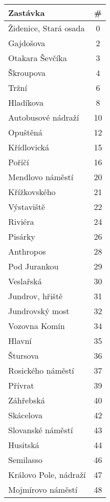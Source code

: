 \begin{table}[h]
  \centering
  \begin{minipage}{0.35\textwidth}
    \centering
    \begin{tabular}{|l|c|}
      \hline
      \textbf{Zastávka} & \# \\ \hline
      Židenice, Stará osada & 0 \\ \hline
      Gajdošova & 2 \\ \hline
      Otakara Ševčíka & 3 \\ \hline
      Škroupova & 4 \\ \hline
      Tržní & 6 \\ \hline
      Hladíkova & 8 \\ \hline
      Autobusové nádraží & 10 \\ \hline
      Opuštěná & 12 \\ \hline
      Křídlovická & 15 \\ \hline
      Poříčí & 16 \\ \hline
      Mendlovo náměstí & 20 \\ \hline
      Křížkovského & 21 \\ \hline
      Výstaviště & 22 \\ \hline
      Riviéra & 24 \\ \hline
      Pisárky & 26 \\ \hline
      Anthropos & 28 \\ \hline
      Pod Jurankou & 29 \\ \hline
      Veslařská & 30 \\ \hline
      Jundrov, hřiště & 31 \\ \hline
      Jundrovský most & 32 \\ \hline
      Vozovna Komín & 34 \\ \hline
      Hlavní & 35 \\ \hline
      Štursova & 36 \\ \hline
      Rosického náměstí & 37 \\ \hline
      Přívrat & 39 \\ \hline
      Záhřebská & 40 \\ \hline
      Skácelova & 42 \\ \hline
      Slovanské náměstí & 43 \\ \hline
      Husitská & 44 \\ \hline
      Semilasso & 46 \\ \hline
      Královo Pole, nádraží & 47 \\ \hline
      Mojmírovo náměstí & 48 \\ \hline

\end{tabular}
\end{minipage}
\end{table}
